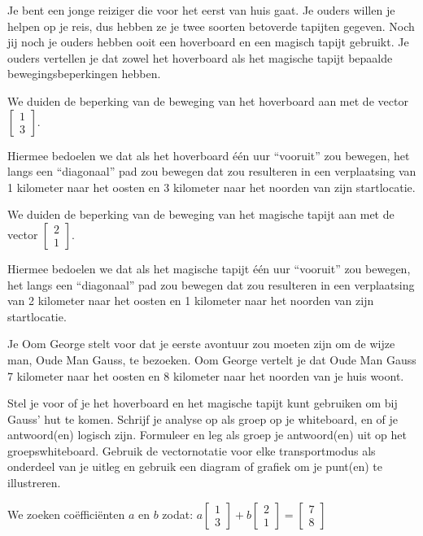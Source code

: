 \documentclass{ximera}
\begin{document}
\author{Alexander Holvoet}

\begin{problem}
Je bent een jonge reiziger die voor het eerst van huis gaat. Je ouders willen je helpen op je reis, dus hebben ze je twee soorten betoverde tapijten gegeven. Noch jij noch je ouders hebben ooit een hoverboard en een magisch tapijt gebruikt. Je ouders vertellen je dat zowel het hoverboard als het magische tapijt bepaalde bewegingsbeperkingen hebben.

We duiden de beperking van de beweging van het hoverboard aan met de vector $\begin{bmatrix} 1 \\ 3 \end{bmatrix}$.

Hiermee bedoelen we dat als het hoverboard één uur ``vooruit'' zou bewegen, het langs een ``diagonaal'' pad zou bewegen dat zou resulteren in een verplaatsing van 1 kilometer naar het oosten en 3 kilometer naar het noorden van zijn startlocatie.

We duiden de beperking van de beweging van het magische tapijt aan met de vector $\begin{bmatrix} 2 \\ 1 \end{bmatrix}$.

Hiermee bedoelen we dat als het magische tapijt één uur ``vooruit'' zou bewegen, het langs een ``diagonaal'' pad zou bewegen dat zou resulteren in een verplaatsing van 2 kilometer naar het oosten en 1 kilometer naar het noorden van zijn startlocatie.

Je Oom George stelt voor dat je eerste avontuur zou moeten zijn om de wijze man, Oude Man Gauss, te bezoeken. Oom George vertelt je dat Oude Man Gauss 7 kilometer naar het oosten en 8 kilometer naar het noorden van je huis woont.

Stel je voor of je het hoverboard en het magische tapijt kunt gebruiken om bij Gauss' hut te komen. Schrijf je analyse op als groep op je whiteboard, en of je antwoord(en) logisch zijn. Formuleer en leg als groep je antwoord(en) uit op het groepswhiteboard. Gebruik de vectornotatie voor elke transportmodus als onderdeel van je uitleg en gebruik een diagram of grafiek om je punt(en) te illustreren.

\begin{freeResponse}
We zoeken coëfficiënten $a$ en $b$ zodat: $a\begin{bmatrix} 1 \\ 3 \end{bmatrix} + b\begin{bmatrix} 2 \\ 1 \end{bmatrix} = \begin{bmatrix} 7 \\ 8 \end{bmatrix}$


\end{freeResponse}
\end{problem}
\end{document}
